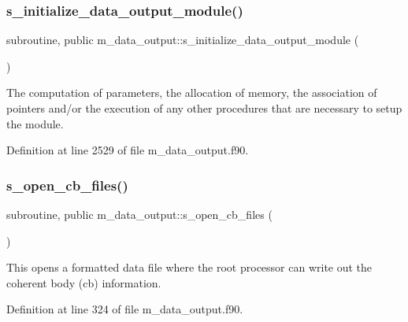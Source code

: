 \subsubsection{\texorpdfstring{s\+\_\+initialize\+\_\+data\+\_\+output\+\_\+module()}{s\_initialize\_data\_output\_module()}}
{\footnotesize\ttfamily subroutine, public m\+\_\+data\+\_\+output\+::s\+\_\+initialize\+\_\+data\+\_\+output\+\_\+module (\begin{DoxyParamCaption}{ }\end{DoxyParamCaption})}



The computation of parameters, the allocation of memory, the association of pointers and/or the execution of any other procedures that are necessary to setup the module. 



Definition at line 2529 of file m\+\_\+data\+\_\+output.\+f90.

\mbox{\label{namespacem__data__output_a411af1336ca1bc899d3b7352d9383a81}} 
\subsubsection{\texorpdfstring{s\+\_\+open\+\_\+cb\+\_\+files()}{s\_open\_cb\_files()}}
{\footnotesize\ttfamily subroutine, public m\+\_\+data\+\_\+output\+::s\+\_\+open\+\_\+cb\+\_\+files (\begin{DoxyParamCaption}{ }\end{DoxyParamCaption})}



This opens a formatted data file where the root processor can write out the coherent body (cb) information. 



Definition at line 324 of file m\+\_\+data\+\_\+output.\+f90.

\mbox{\label{namespacem__data__output_a36714d4cf746d5beb2736752fdd6d747}} 
